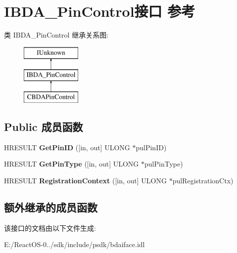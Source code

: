 \hypertarget{interface_i_b_d_a___pin_control}{}\section{I\+B\+D\+A\+\_\+\+Pin\+Control接口 参考}
\label{interface_i_b_d_a___pin_control}
类 I\+B\+D\+A\+\_\+\+Pin\+Control 继承关系图\+:\begin{figure}[H]
\begin{center}
\leavevmode
\includegraphics[height=3.000000cm]{interface_i_b_d_a___pin_control}
\end{center}
\end{figure}
\subsection*{Public 成员函数}
\begin{DoxyCompactItemize}
\item 
\mbox{\label{interface_i_b_d_a___pin_control_ab83751edf370200dfd0598116df56051}} 
H\+R\+E\+S\+U\+LT {\bfseries Get\+Pin\+ID} (\mbox{[}in, out\mbox{]} U\+L\+O\+NG $\ast$pul\+Pin\+ID)
\item 
\mbox{\label{interface_i_b_d_a___pin_control_adf8e4ad27a826343e0df84603326c6a3}} 
H\+R\+E\+S\+U\+LT {\bfseries Get\+Pin\+Type} (\mbox{[}in, out\mbox{]} U\+L\+O\+NG $\ast$pul\+Pin\+Type)
\item 
\mbox{\label{interface_i_b_d_a___pin_control_a6840956cb7f586921dc38950eb402637}} 
H\+R\+E\+S\+U\+LT {\bfseries Registration\+Context} (\mbox{[}in, out\mbox{]} U\+L\+O\+NG $\ast$pul\+Registration\+Ctx)
\end{DoxyCompactItemize}
\subsection*{额外继承的成员函数}


该接口的文档由以下文件生成\+:\begin{DoxyCompactItemize}
\item 
E\+:/\+React\+O\+S-\/0../sdk/include/psdk/bdaiface.\+idl\end{DoxyCompactItemize}
